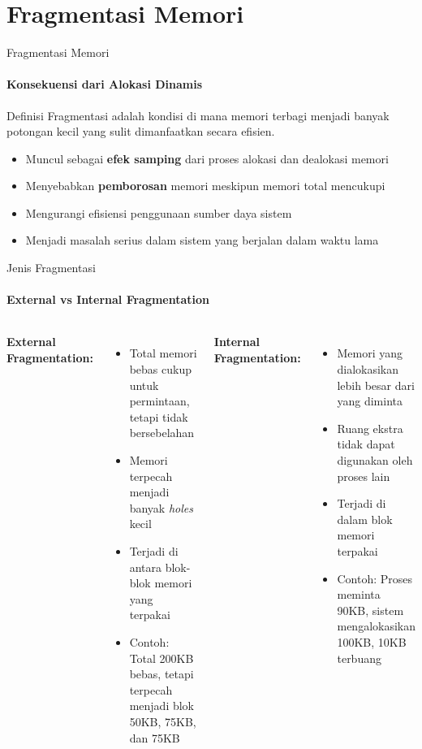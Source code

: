 \documentclass[10pt,aspectratio=169]{beamer}
\begin{document}
\section{Fragmentasi Memori}

\begin{frame}{Fragmentasi Memori}
    \framesubtitle{Konsekuensi dari Alokasi Dinamis}
    
    \begin{block}{Definisi}
        Fragmentasi adalah kondisi di mana memori terbagi menjadi banyak potongan kecil yang sulit dimanfaatkan secara efisien.
    \end{block}
    
    \begin{itemize}
        \item Muncul sebagai \textbf{efek samping} dari proses alokasi dan dealokasi memori
        \item Menyebabkan \textbf{pemborosan} memori meskipun memori total mencukupi
        \item Mengurangi efisiensi penggunaan sumber daya sistem
        \item Menjadi masalah serius dalam sistem yang berjalan dalam waktu lama
    \end{itemize}
\end{frame}

\begin{frame}{Jenis Fragmentasi}
    \framesubtitle{External vs Internal Fragmentation}
    
    \begin{columns}[T]
            \textbf{External Fragmentation:}
            \begin{itemize}
                \item Total memori bebas cukup untuk permintaan, tetapi tidak bersebelahan
                \item Memori terpecah menjadi banyak \textit{holes} kecil
                \item Terjadi di antara blok-blok memori yang terpakai
                \item Contoh: Total 200KB bebas, tetapi terpecah menjadi blok 50KB, 75KB, dan 75KB
            \end{itemize}
            
            \textbf{Internal Fragmentation:}
            \begin{itemize}
                \item Memori yang dialokasikan lebih besar dari yang diminta
                \item Ruang ekstra tidak dapat digunakan oleh proses lain
                \item Terjadi di dalam blok memori terpakai
                \item Contoh: Proses meminta 90KB, sistem mengalokasikan 100KB, 10KB terbuang
            \end{itemize}
    \end{columns}
\end{frame}
\end{document}
